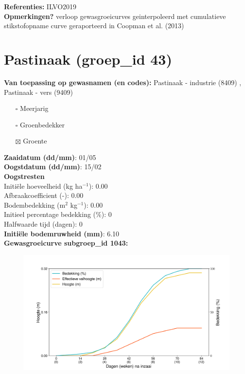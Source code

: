 \documentclass{article}
\begin{document}
  \textbf{Referenties:} ILVO2019  \vspace{0.10cm} \\ 
  \textbf{Opmerkingen?} verloop gewasgroeicurves geinterpoleerd met cumulatieve stikstofopname curve geraporteerd in Coopman et al. (2013) \vspace{0.10cm} \\ 
 \newpage 
 \section{Pastinaak  (groep\_id 43)} 
 \textbf{Van toepassing op gewasnamen (en codes):} Pastinaak - industrie (8409) , Pastinaak - vers (9409) 
 \begin{multicols}{3} \begin{itemize} \item[$\square$] Meerjarig \item[$\square$] Groenbedekker \item[$\boxtimes$] Groente \end{itemize} \end{multicols} 
  \textbf{Zaaidatum (dd/mm)}: 01/05  \vspace{0.10cm} \\ 
  \textbf{Oogstdatum (dd/mm)}: 15/02  \vspace{0.10cm} \\ 
  \textbf{Oogstresten} \vspace{0.05cm} \\ 
  \tab Initi\"{e}le hoeveelheid (kg ha$^{-1}$): 0.00 \vspace{0.05cm} \\ 
  \tab Afbraakcoefficient (-): 0.00 \vspace{0.05cm} \\ 
  \tab Bodembedekking (m$^2$ kg$^{-1}$): 0.00 \vspace{0.05cm} \\ 
  \tab Initieel percentage bedekking (\%): 0 \vspace{0.05cm} \\ 
  \tab Halfwaarde tijd (dagen): 0 \vspace{0.05cm} \\ 
  \textbf{Initi\"{e}le bodemruwheid (mm)}: 6.10 \vspace{0.05cm} \\ 
  \textbf{Gewasgroeicurve subgroep\_id 1043:} 
 \begin{center} \begin{figure}[H] \includegraphics[width=12.5cm]{temp/1043.png} \end{figure} \end{center} 
\end{document}
